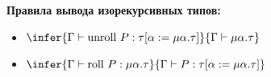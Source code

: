\documentclass{article}
\begin{document}
	\textbf{Правила вывода изорекурсивных типов:}
	\begin{itemize}
		\item $\infer{\Gamma \vdash \text{unroll } P : \tau [\alpha := \mu \alpha. \tau]}{\Gamma \vdash \mu \alpha. \tau}$
		\item $\infer{\Gamma \vdash \text{roll } P : \mu \alpha. \tau}{\Gamma \vdash P : \tau [\alpha := \mu \alpha. \tau]}$
	\end{itemize}
\end{document}
